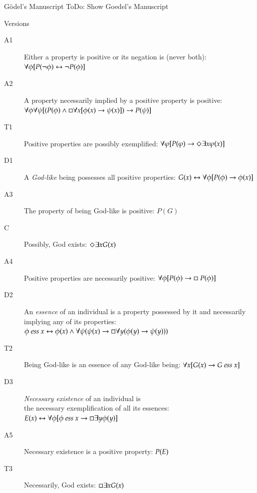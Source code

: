 
\begin{frame}{G\"odel's Manuscript}
ToDo: Show Goedel's Manuscript
\end{frame}

\begin{frame}[shrink]{Versions}
    \begin{description}
		\item[A1] Either a property is positive or its negation is (never both):  \hfill 
		  $\forall \phi [P(\neg \phi) \leftrightarrow \neg P(\phi)]$
		\item[A2] A property necessarily implied by a
		  positive property is positive: \phantom{b} \hfill 
		  $\forall \phi \forall \psi [(P(\phi) \wedge \Box \forall x [\phi(x)
		  \rightarrow \psi(x)]) \rightarrow P(\psi)]$ 
		\item[T1] Positive properties are possibly exemplified: \hfill $\forall \varphi [P(\varphi) \rightarrow \Diamond \exists x \varphi(x)]$
		\item[D1] A \emph{God-like} being possesses all positive properties: \hfill
		  $G(x) \leftrightarrow \forall \phi [P(\phi) \to \phi(x)]$
		\item[A3]  The property of being God-like is positive: \hfill   $P(G)$
		\item[C\phantom{1}] Possibly, God exists: \hfill $\Diamond \exists x G(x)$
		\item[A4]  Positive properties are necessarily positive: \hfill 
		  $\forall \phi [P(\phi) \to \Box \; P(\phi)]$
		\item[D2] An \emph{essence} of an individual is a property possessed by it and necessarily implying any of its properties:
		  \phantom{b} \hfill $\phi \ \mathit{ess} \ x \leftrightarrow \phi(x) \wedge \forall
		  \psi (\psi(x) \rightarrow \Box \forall y (\phi(y) \rightarrow \psi(y)))$
		\item[T2]  Being God-like is an essence of any
		  God-like being: \hfill $\forall x [G(x) \rightarrow G \ \mathit{ess} \ x]$ 
		\item[D3] \emph{Necessary existence} of an individual is \\ the necessary exemplification of all its essences: 
		  \phantom{b} \hfill $E(x) \leftrightarrow \forall \phi [\phi \ \mathit{ess} \ x \rightarrow \Box \exists y \phi(y)]$
		\item[A5] Necessary existence is a positive property: \hfill $P(E)$
		\item[T3] Necessarily, God exists: \hfill $\Box \exists x G(x)$ 
		\end{description}

\end{frame}


